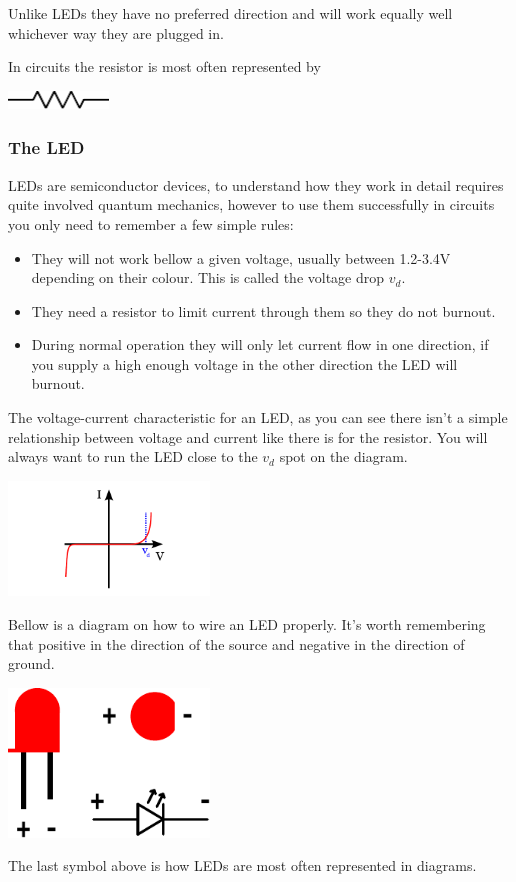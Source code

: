 Unlike LEDs they have no preferred direction and will work equally well whichever way they are plugged in.

In circuits the resistor is most often represented by

\begin{center}
    \includegraphics[width=0.2\textwidth]{./Graphics/resistorSymbol}
\end{center}


\subsubsection{The LED}
LEDs are semiconductor devices,
to understand how they work in detail requires quite involved quantum mechanics,
however to use them successfully in circuits you only need to remember a few simple rules:

\begin{itemize}
\item They will not work bellow a given voltage, 
usually between 1.2-3.4V depending on their colour.
This is called the voltage drop $v_d$.
\item They need a resistor to limit current through them so they do not burnout.
\item During normal operation they will only let current flow in one direction,
if you supply a high enough voltage in the other direction the LED will burnout. 
\end{itemize}

The voltage-current characteristic for an LED,
as you can see there isn't a simple relationship between voltage and current like there is for the resistor.
You will always want to run the LED close to the $v_d$ spot on the diagram.
\begin{center}
    \includegraphics[width=0.4\textwidth]{./Graphics/LED_Characteristic}
\end{center}


Bellow is a diagram on how to wire an LED properly.
It's worth remembering that positive in the direction of the source
and negative in the direction of ground.
\begin{center}
    \includegraphics[width=0.4\textwidth]{./Graphics/led_pins}
\end{center}

The last symbol above is how LEDs are most often represented
in diagrams.

